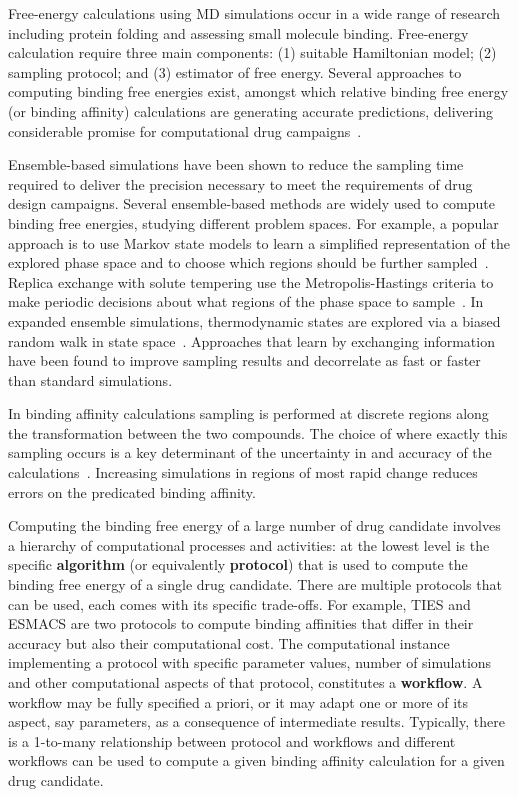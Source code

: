 Free-energy calculations using MD simulations occur in a wide range of
research including protein folding and assessing small molecule binding.
Free-energy calculation require three main components: (1) suitable
Hamiltonian model; (2) sampling protocol; and (3) estimator of free energy.
Several approaches to computing binding free energies exist, amongst which
relative binding free energy (or binding affinity) calculations are
generating accurate predictions, delivering considerable promise for
computational drug campaigns~\cite{Karplus2005}.

Ensemble-based simulations have been shown to reduce the sampling time
required to deliver the precision necessary to meet the requirements of drug
design campaigns. Several ensemble-based methods are widely used to compute
binding free energies, studying different problem spaces. For example, a
popular approach is to use Markov state models to learn a simplified
representation of the explored phase space and to choose which regions should
be further sampled~\cite{Bowman2010}. Replica exchange with solute tempering
use the Metropolis-Hastings criteria to make periodic decisions about what
regions of the phase space to sample~\cite{Earl2005,Hritz2008,Kim2012}. In
expanded ensemble simulations, thermodynamic states are explored via a biased
random walk in state space~\cite{Lyubartsev1992}. Approaches that learn by
exchanging information have been found to improve sampling results and
decorrelate as fast or faster than standard simulations.

In binding affinity calculations sampling is performed at discrete regions
along the transformation between the two compounds. The choice of where
exactly this sampling occurs is a key determinant of the uncertainty in and
accuracy of the calculations~\cite{Ruiter2013,Ruiter2016}. Increasing
simulations in regions of most rapid change reduces errors on the predicated
binding affinity.

Computing the binding free energy of a large number of drug candidate
involves a hierarchy of computational processes and activities: at the lowest
level is the specific \textbf{algorithm} (or equivalently \textbf{protocol})
that is used to compute the binding free energy of a single drug candidate.
There are multiple protocols that can be used, each comes with its specific
trade-offs. For example, TIES and ESMACS are two protocols to compute binding
affinities that differ in their accuracy but also their computational cost.
The computational instance implementing a protocol with specific parameter
values, number of simulations and other computational aspects of that
protocol, constitutes a \textbf{workflow}. A workflow may be fully specified
a priori, or it may adapt one or more of its aspect, say parameters, as a
consequence of intermediate results. Typically, there is a 1-to-many
relationship between protocol and workflows and different workflows can be
used to compute a given binding affinity calculation for a given drug
candidate.

